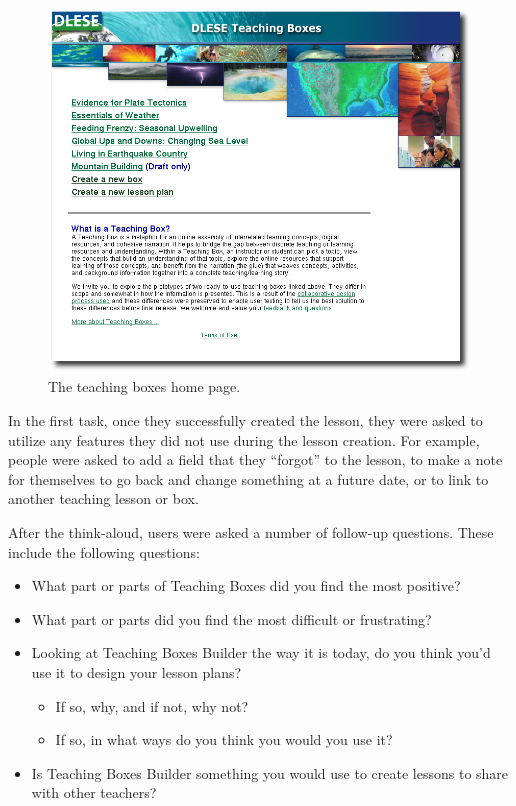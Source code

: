 \documentclass[10pt,letter,titlepage]{article}
\begin{document}
\begin{figure}[htb]
	\centering
	\includegraphics[width=0.9\linewidth]{figures/teaching_boxes_home}
	\caption{The teaching boxes home page.}
	\label{fig: homepage}
\end{figure}

In the first task, once they successfully created the lesson, they were asked to
utilize any features they did not use during the lesson creation. For example,
people were asked to add a field that they ``forgot'' to the lesson, to make a
note for themselves to go back and change something at a future date, or to link
to another teaching lesson or box.

After the think-aloud, users were asked a number of follow-up questions.  These include
the following questions:

\begin{itemize}
\item What part or parts of Teaching Boxes did you find the most positive?
\item What part or parts did you find the most difficult or frustrating?
\item Looking at Teaching Boxes Builder the way it is today, do you think you'd
      use it to design your lesson plans?
      \begin{itemize}
	  \item If so, why, and if not, why not?
	  \item If so, in what ways do you think you would you use it?
	  \end{itemize}
\item Is Teaching Boxes Builder something you would use to create lessons to
	  share with other teachers?
\end{itemize}
\end{document}
